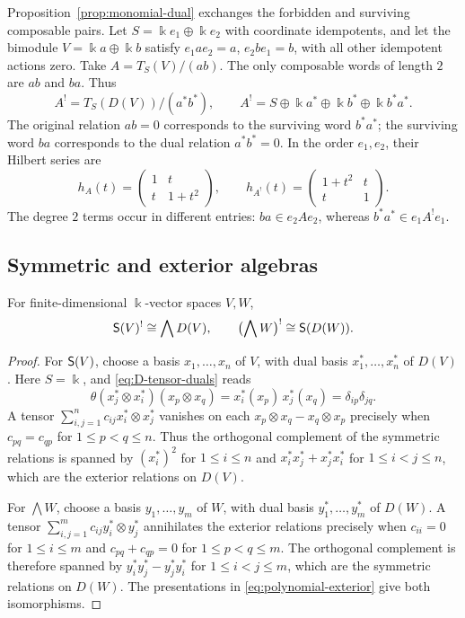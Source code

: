\begin{supplementary}
\begin{example}\label{ex:alternating-quadratic-dual}
Proposition~\ref{prop:monomial-dual} exchanges the forbidden and surviving composable pairs.
Let $S=\Bbbk e_1\oplus\Bbbk e_2$ with coordinate idempotents, and let the bimodule $V=\Bbbk a\oplus\Bbbk b$ satisfy $e_1ae_2=a$, $e_2be_1=b$, with all other idempotent actions zero.
Take $A=T_S(V)/(ab)$.
The only composable words of length $2$ are $ab$ and $ba$. Thus
\[
A^!=T_S(D(V))/(a^*b^*),\qquad
A^!=S\oplus\Bbbk a^*\oplus\Bbbk b^*\oplus\Bbbk b^*a^*.
\]
The original relation $ab=0$ corresponds to the surviving word $b^*a^*$; the surviving word $ba$ corresponds to the dual relation $a^*b^*=0$.
In the order $e_1,e_2$, their Hilbert series are
\[
h_A(t)=\begin{pmatrix}1&t\\t&1+t^2\end{pmatrix},\qquad
h_{A^!}(t)=\begin{pmatrix}1+t^2&t\\t&1\end{pmatrix}.
\]
The degree $2$ terms occur in different entries: $ba\in e_2Ae_2$, whereas $b^*a^*\in e_1A^!e_1$.
\end{example}
\end{supplementary}


\subsection{Symmetric and exterior algebras}

\begin{proposition}\label{prop:symmetric-exterior-dual}
For finite-dimensional $\Bbbk$-vector spaces $V,W$,
\[
\mathsf{S}(V)^!\cong\bigwedge D(V),\qquad
\bigl(\bigwedge W\bigr)^!\cong\mathsf{S}(D(W)).
\]
\end{proposition}

\begin{proof}
For $\mathsf{S}(V)$, choose a basis $x_1,\ldots,x_n$ of $V$, with dual basis $x_1^*,\ldots,x_n^*$ of $D(V)$.
Here $S=\Bbbk$, and \eqref{eq:D-tensor-duals} reads
\[
\theta(x_j^*\otimes x_i^*)(x_p\otimes x_q)=x_i^*(x_p)\,x_j^*(x_q)=\delta_{ip}\delta_{jq}.
\]
A tensor $\sum_{i,j=1}^n c_{ij}x_i^*\otimes x_j^*$ vanishes on each $x_p\otimes x_q-x_q\otimes x_p$ precisely when $c_{pq}=c_{qp}$ for $1\leq p<q\leq n$.
Thus the orthogonal complement of the symmetric relations is spanned by $(x_i^*)^2$ for $1\leq i\leq n$ and $x_i^*x_j^*+x_j^*x_i^*$ for $1\leq i<j\leq n$, which are the exterior relations on $D(V)$.

For $\bigwedge W$, choose a basis $y_1,\ldots,y_m$ of $W$, with dual basis $y_1^*,\ldots,y_m^*$ of $D(W)$.
A tensor $\sum_{i,j=1}^m c_{ij}y_i^*\otimes y_j^*$ annihilates the exterior relations precisely when $c_{ii}=0$ for $1\leq i\leq m$ and $c_{pq}+c_{qp}=0$ for $1\leq p<q\leq m$.
The orthogonal complement is therefore spanned by $y_i^*y_j^*-y_j^*y_i^*$ for $1\leq i<j\leq m$, which are the symmetric relations on $D(W)$.
The presentations in \eqref{eq:polynomial-exterior} give both isomorphisms.
\end{proof}

